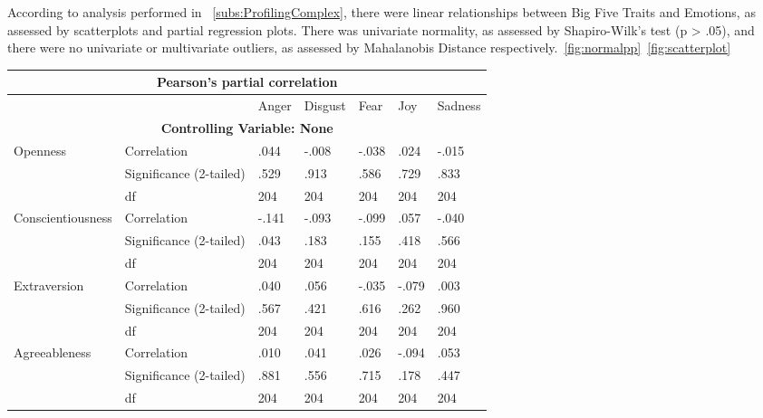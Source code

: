 \documentclass{llncs}
\begin{document}
According to analysis performed in ~\ref{subs:ProfilingComplex}, there were linear relationships between Big Five Traits and Emotions, as assessed by scatterplots and partial regression plots. There was univariate normality, as assessed by Shapiro-Wilk's test (p > .05), and there were no univariate or multivariate outliers, as assessed by Mahalanobis Distance respectively.~\ref{fig:normalpp}~\ref{fig:scatterplot} 

\begin{table}[]
\centering
\begin{tabular}{@{}lllllll@{}}
\toprule
\multicolumn{7}{c}{Pearson's partial correlation}                                       \\ \midrule
                  &                         & Anger & Disgust & Fear  & Joy   & Sadness \\
\multicolumn{7}{c}{\textbf{Controlling Variable: None}}                                 \\
Openness          & Correlation             & .044  & -.008   & -.038 & .024  & -.015   \\
                  & Significance (2-tailed) & .529  & .913    & .586  & .729  & .833    \\
                  & df                      & 204   & 204     & 204   & 204   & 204     \\
Conscientiousness & Correlation             & -.141 & -.093   & -.099 & .057  & -.040   \\
                  & Significance (2-tailed) & .043  & .183    & .155  & .418  & .566    \\
                  & df                      & 204   & 204     & 204   & 204   & 204     \\
Extraversion      & Correlation             & .040  & .056    & -.035 & -.079 & .003    \\
                  & Significance (2-tailed) & .567  & .421    & .616  & .262  & .960    \\
                  & df                      & 204   & 204     & 204   & 204   & 204     \\
Agreeableness     & Correlation             & .010  & .041    & .026  & -.094 & .053    \\
                  & Significance (2-tailed) & .881  & .556    & .715  & .178  & .447    \\
                  & df                      & 204   & 204     & 204   & 204   & 204     \\

\end{tabular}
\end{table}
\end{document}
